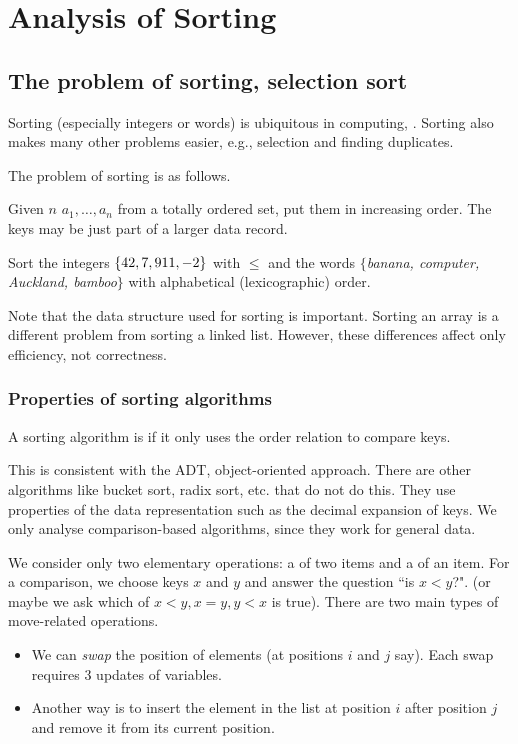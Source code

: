 \part{Analysis of Sorting}  
\label{ch:effsort}

\chapter{The problem of sorting, selection sort} %
\label{sec:sortingproblem}
Sorting (especially integers or words) is ubiquitous in computing, .
Sorting also makes many other problems easier, e.g., selection and finding duplicates.

The problem of sorting is as follows. 
\begin{Definition}
Given $n$  $a_1, \dots , a_n$ from a totally ordered set, put them in increasing order. 
The keys may be just part of a larger data record.
\end{Definition}
\begin{Boxample}[2]
Sort the integers $\mbox{$\{42, 7, 911, -2\}$}$ with $\leq$ 
and the words $\{$\textit{banana, computer, Auckland, bamboo}$\}$ with  alphabetical (lexicographic) order.
\end{Boxample}


Note that the data structure used for sorting is important. 
Sorting an array is a different problem from sorting a linked list. 
However, these differences affect  only efficiency, not correctness.  

\section{Properties of sorting algorithms}

\begin{Definition}
A sorting algorithm is  if it only uses the order relation to compare keys.
\end{Definition}

This is consistent with the ADT, object-oriented approach. 
There are other algorithms like bucket sort, radix sort, etc. that do not do this. 
They use properties of the data representation such as the decimal expansion of keys.
We only analyse comparison-based algorithms, since they work for general data.

We consider only two elementary operations: a  of two items and a  of an item.
For a comparison, we choose keys $x$ and $y$ and answer the question ``is $x<y$?". (or maybe we ask which of $x<y, x=y, y<x$ is true). 
There are two main types of move-related operations. 
\begin{itemize}
\item We can \emph{swap} the position of elements (at positions $i$ and $j$ say). 
Each swap requires 3 updates of variables.
\item Another way is to insert the element in the list at position $i$ after position $j$ and remove it from its current position.
\end{itemize}

